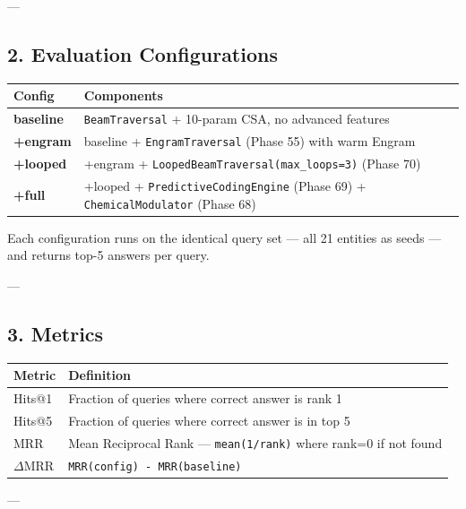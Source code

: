 ---

\subsection{2. Evaluation Config\-urations}

\begin{center}
\begin{tabularx}{\columnwidth}{|>{\raggedright\arraybackslash}X|>{\raggedright\arraybackslash}X|}
\hline
Config & Components \\ \hline
\textbf{baseline} & \texttt{BeamTraversal} + 10-param CSA, no advanced features \\ \hline
\textbf{+engram} & baseline + \texttt{EngramTraversal} (Phase 55) with warm Engram \\ \hline
\textbf{+looped} & +engram + \texttt{LoopedBeamTraversal(max\_loops=3)} (Phase 70) \\ \hline
\textbf{+full} & +looped + \texttt{PredictiveCodingEngine} (Phase 69) + \texttt{ChemicalModulator} (Phase 68) \\ \hline
\end{tabularx}
\end{center}

Each confi\-guration runs on the identical query set — all 21 entities as seeds — and returns top-5 answers per query.

---

\subsection{3. Metrics}

\begin{center}
\begin{tabularx}{\columnwidth}{|>{\raggedright\arraybackslash}X|>{\raggedright\arraybackslash}X|}
\hline
Metric & Definition \\ \hline
Hits@1 & Fraction of queries where correct answer is rank 1 \\ \hline
Hits@5 & Fraction of queries where correct answer is in top 5 \\ \hline
MRR & Mean Reciprocal Rank — \texttt{mean(1/rank)} where rank=0 if not found \\ \hline
$\Delta$MRR & \texttt{MRR(config) - MRR(baseline)} \\ \hline
\end{tabularx}
\end{center}

---

